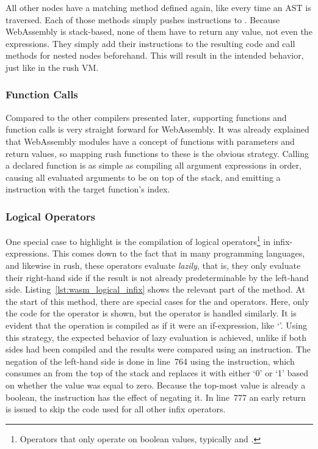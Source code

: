 All other nodes have a matching method defined again, like every time an AST is traversed.
Each of those methods simply pushes instructions to .
Because WebAssembly is stack-based, none of them have to return any value, not even the expressions.
They simply add their instructions to the resulting code and call methods for nested nodes beforehand.
This will result in the intended behavior, just like in the rush VM\@.

\subsubsection{Function Calls}

Compared to the other compilers presented later, supporting functions and function calls is very straight forward for WebAssembly.
It was already explained that WebAssembly modules have a concept of functions with parameters and return values, so mapping rush functions to these is the obvious strategy.
Calling a declared function is as simple as compiling all argument expressions in order, causing all evaluated arguments to be on top of the stack, and emitting a  instruction with the target function's index.

\subsubsection{Logical Operators}


One special case to highlight is the compilation of logical operators\footnote{Operators that only operate on boolean values, typically \qVerb{&&} and \qVerb{||}.} in infix-expressions.
This comes down to the fact that in many programming languages, and likewise in rush, these operators evaluate \emph{lazily}, that is, they only evaluate their right-hand side if the result is not already predeterminable by the left-hand side.
Listing~\ref{lst:wasm_logical_infix} shows the relevant part of the  method.
At the start of this method, there are special cases for the \qVerb{&&} and \qVerb{||} operators.
Here, only the code for the \qVerb{&&} operator is shown, but the \qVerb{||} operator is handled similarly.
It is evident that the operation is compiled as if it were an if-expression, like `'.
Using this strategy, the expected behavior of lazy evaluation is achieved, unlike if both sides had been compiled and the results were compared using an  instruction.
The negation of the left-hand side is done in line~764 using the  instruction, which consumes an  from the top of the stack and replaces it with either `0' or `1' based on whether the value was equal to zero.
Because the top-most value is already a boolean, the instruction has the effect of negating it.
In line~777 an early return is issued to skip the code used for all other infix operators.

